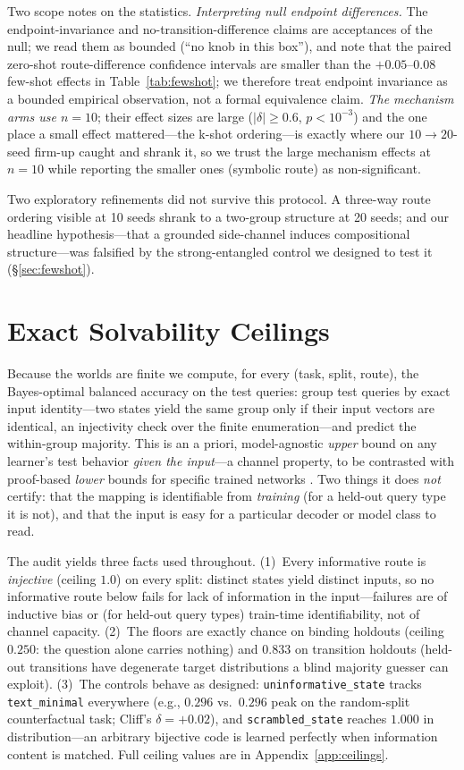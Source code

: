 \documentclass[10pt]{article} %
\begin{document}
Two scope notes on the statistics. \emph{Interpreting null endpoint differences.} The endpoint-invariance
and no-transition-difference claims are acceptances of the null; we read them as bounded (``no knob
in this box''), and note that the paired zero-shot route-difference confidence intervals are smaller
than the $+0.05$--$0.08$ few-shot effects in Table~\ref{tab:fewshot}; we therefore treat endpoint
invariance as a bounded empirical observation, not a formal
equivalence claim.
\emph{The mechanism arms use $n{=}10$}; their effect sizes are large ($|\delta|\ge0.6$, $p<10^{-3}$)
and the one place a small effect mattered---the k-shot ordering---is exactly where our $10\to20$-seed
firm-up caught and shrank it, so we trust the large mechanism effects at $n{=}10$ while reporting the
smaller ones (symbolic route) as non-significant.

Two exploratory refinements did not survive this protocol. A three-way
route ordering visible at 10 seeds shrank to a two-group structure at 20 seeds; and our headline
hypothesis---that a grounded side-channel induces compositional structure---was falsified by the
strong-entangled control we designed to test it (\S\ref{sec:fewshot}).

\section{Exact Solvability Ceilings}
\label{sec:ceilings}
Because the worlds are finite we compute, for every (task, split, route), the Bayes-optimal
balanced accuracy on the test queries: group test queries by exact input identity---two states
yield the same group only if their input vectors are identical, an injectivity check over the
finite enumeration---and predict the within-group majority. This is an a priori, model-agnostic
\emph{upper} bound on any learner's test behavior \emph{given the input}---a channel property, to
be contrasted with proof-based \emph{lower} bounds for specific trained networks
\citep{gross2024compact}. Two things it does \emph{not} certify: that the mapping is identifiable
from \emph{training} (for a held-out query type it is not), and that the input is easy for a
particular decoder or model class to read.

The audit yields three facts used throughout. (1)~Every informative route is \emph{injective}
(ceiling $1.0$) on every split: distinct states yield distinct inputs, so no informative route below fails for
lack of information in the input---failures are of inductive bias or (for held-out query types)
train-time identifiability, not of channel capacity. (2)~The floors are exactly chance on binding
holdouts (ceiling $0.250$: the question alone carries nothing) and $0.833$ on transition holdouts
(held-out transitions have degenerate target distributions a blind majority guesser can exploit).
(3)~The controls behave as designed: \texttt{uninformative\_state} tracks \texttt{text\_minimal}
everywhere (e.g., $0.296$ vs.\ $0.296$ peak on the random-split counterfactual task; Cliff's
$\delta = +0.02$), and \texttt{scrambled\_state} reaches $1.000$ in distribution---an arbitrary
bijective code is learned perfectly when information content is matched. Full ceiling values are
in Appendix~\ref{app:ceilings}.
\end{document}
